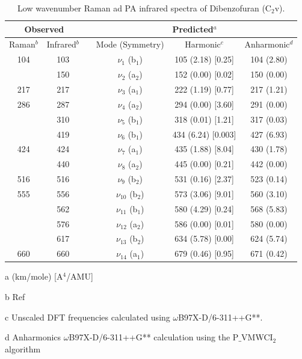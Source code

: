 \begin{table}[H]
	\caption{Low wavenumber Raman ad PA infrared spectra of Dibenzofuran (C$_{2}$v).}
	\begin{center}
		\begin{threeparttable}
			\begin{tabular}{c c c c c c}
				\hline
				\multicolumn{ 2}{c}{Observed} & \multicolumn{1}{c}{} & \multicolumn{ 3}{c}{Predicted$^{a}$} \\ \hline
				Raman$^{b}$ & \multicolumn{1}{c}{Infrared$^{b}$} &  & \multicolumn{1}{c}{Mode (Symmetry)} & \multicolumn{1}{c}{Harmonic$^{c}$} & Anharmonic$^{d}$ \\ \hline
	104 & 103 &  & $\nu_{1}$ (b$_{1}$) & 105 (2.18) [0.25] & 104 (2.80) \\ 
	& 150 &  &  $\nu_{2}$ (a$_{2}$) & 152 (0.00) [0.02] & 150 (0.00) \\ 
	217 & 217 &  & $\nu_{3}$ (a$_{1}$) & 222 (1.19) [0.77] & 217 (1.21) \\
	286 & 287 &  &$\nu_{4}$ (a$_{2}$) & 294 (0.00) [3.60] & 291 (0.00) \\ 
	& 310 &  & $\nu_{5}$ (b$_{1}$) & 318 (0.01) [1.21] & 317 (0.03) \\ 
	& 419 &  & $\nu_{6}$ (b$_{1}$) & 434 (6.24) [0.003] & 427 (6.93) \\
	424 & 424 &  & $\nu_{7}$ (a$_{1}$) & 435 (1.88) [8.04] & 430 (1.78) \\ 
	& 440 &  & $\nu_{8}$ (a$_{2}$) & 445 (0.00) [0.21] & 442 (0.00) \\ 
	516 & 516 &  & $\nu_{9}$ (b$_{2}$)  & 531 (0.16) [2.37] & 523 (0.14)		\\ 
	555 & 556 &  & $\nu_{10}$ (b$_{2}$) & 573 (3.06) [9.01] & 560 (3.10) \\ 
	& 562 &  & $\nu_{11}$ (b$_{1}$) & 580 (4.29) [0.24] & 568 (5.83) \\
	& 576 &  & $\nu_{12}$ (a$_{2}$) & 586 (0.00) [0.01] & 580 (0.00) \\ 
	& 617 &  & $\nu_{13}$ (b$_{2}$) & 634 (5.78) [0.00] & 624 (5.74) \\ 
	660 & 660 &  & $\nu_{14}$ (a$_{1}$)  & 679 (0.46) [0.95] & 671 (0.42) \\		
		\bottomrule	
\end{tabular}

\begin{tablenotes}
	\item[a] (km/mole) [A$^{4}$/AMU]
	\item[b] Ref \cite{klots1996vibrational}
	\item[c] Unscaled DFT frequencies calculated using $\omega$B97X-D/6-311++G**.
	\item[d] Anharmonics $\omega$B97X-D/6-311++G** calculation using the P$\_$VMWCI$_{2}$ algorithm
\end{tablenotes}
\end{threeparttable}
\end{center}
\label{lowfreq-Dibenzofuran}
\end{table}




